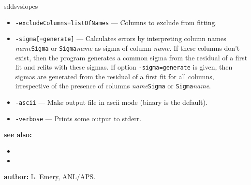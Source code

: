 \begin{sddsprog}{sddsvslopes}
\begin{itemize}
      \item \verb|-excludeColumns=listOfNames| --- Columns to exclude from fitting.
      \item \verb|-sigma[=generate]| --- Calculates errors by interpreting column names \emph{name}\verb|Sigma| or \verb|Sigma|\emph{name} as sigma of column \emph{name}. If these columns don't exist, then the program generates a common sigma from the residual of a first fit and refits with these sigmas. If option \verb|-sigma=generate| is given, then sigmas are generated from the residual of a first fit for all columns, irrespective of the presence of columns \emph{name}\verb|Sigma| or \verb|Sigma|\emph{name}.
      \item \verb|-ascii| --- Make output file in ascii mode (binary is the default).
      \item \verb|-verbose| --- Prints some output to stderr.
    \end{itemize}
  \item \textbf{see also:}
    \begin{itemize}
      \item {}
      \item {}
    \end{itemize}
  \item \textbf{author:} L. Emery, ANL/APS.
\end{sddsprog}
